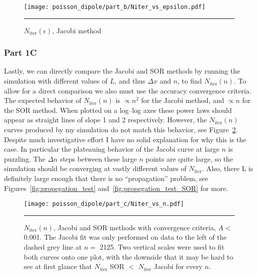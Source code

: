 \documentclass[notitlepage,aps,prd,nofootinbib]{revtex4-1}
\begin{document}
\begin{figure}[!htbc]
  \centering
  \texttt{[image: poisson\_dipole/part\_b/Niter\_vs\_epsilon.pdf]}
	{\par\nobreak\rule[9pt]{35em}{0.5pt}\vspace{-5mm}}
	\caption{$N_{\mathrm{iter}}\left(\epsilon\right)$, Jacobi method}
	\label{fig:part1b}
\end{figure}

\clearpage
\subsubsection{Part 1C}
\label{subsubsec:part_1c}

Lastly, we can directly compare the Jacobi and SOR methods by running the simulation with different values of $L$, and thus $\Delta x$ and $n$, to find $N_{\mathrm{iter}}\left(n\right)$. To allow for a direct comparison we also must use the accuracy convergence criteria. The expected behavior of $N_{\mathrm{iter}}\left(n\right)$ is $\propto n^{2}$ for the Jacobi method, and $\propto n$ for the SOR method. When plotted on a log--log axes these power laws should appear as straight lines of slope 1 and 2 respectively. However, the $N_{\mathrm{iter}}\left(n\right)$ curves produced by my simulation do not match this behavior, see Figure~\ref{fig:part1c}. Despite much investigative effort I have no solid explanation for why this is the case. In particular the plateauing behavior of the Jacobi curve at large $n$ is puzzling. The $\Delta n$ steps between these large $n$ points are quite large, so the simulation should be converging at vastly different values of $N_{\mathrm{iter}}$. Also, there L is definitely large enough that there is no ``propagation'' problem, see Figures~\ref{fig:propegation_test} and~\ref{fig:propegation_test_SOR} for more.  

\begin{figure}[!htbc]
  \centering
  \texttt{[image: poisson\_dipole/part\_c/Niter\_vs\_n.pdf]}
	{\par\nobreak\rule[9pt]{35em}{0.5pt}\vspace{-5mm}}
	\caption{$N_{\mathrm{iter}}\left(n\right)$, Jacobi and SOR methods with convergence criteria, $A <$ 0.001. The Jacobi fit was only performed on data to the left of the dashed grey line at $n =$ 2125. Two vertical scales were used to fit both curves onto one plot, with the downside that it may be hard to see at first glance that $N_{\mathrm{iter}}$ SOR $<$ $N_{\mathrm{iter}}$ Jacobi for every $n$.}
	\label{fig:part1c}
\end{figure}
\end{document}
